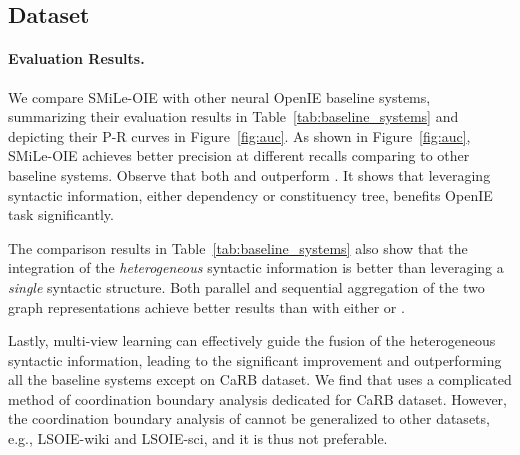 \documentclass[11pt]{article}
\newcommand{\mname}{SMiLe-OIE\xspace}
\begin{document}
\subsection{Dataset}

\paragraph{Evaluation Results.}
We compare \mname with other neural OpenIE baseline systems, summarizing their evaluation results in Table~\ref{tab:baseline_systems} and depicting their P-R curves in Figure~\ref{fig:auc}. As shown in Figure~\ref{fig:auc}, \mname achieves better precision at different recalls comparing to other baseline systems.
Observe that both  and  outperform . 
It shows that leveraging syntactic information, either dependency or constituency tree, benefits OpenIE task significantly. 

The comparison results in Table~\ref{tab:baseline_systems} also show that the integration of the \textit{heterogeneous} syntactic information is better than leveraging a \textit{single} syntactic structure. Both parallel and sequential aggregation of the two graph representations achieve better results than  with either  or .

Lastly, multi-view learning can effectively guide the fusion of the heterogeneous syntactic information, leading to the significant improvement
and outperforming all the baseline systems except  on CaRB dataset. We find that  uses a complicated method of coordination boundary analysis dedicated for CaRB dataset. However, the coordination boundary analysis of  cannot be generalized to other datasets, e.g., LSOIE-wiki and LSOIE-sci, and it is thus not preferable.
\end{document}
